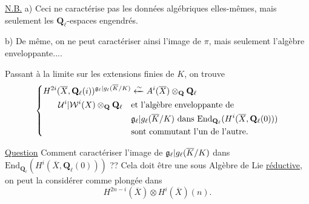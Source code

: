 \uline{N.B.} a) Ceci ne caractérise pas les données algébriques elles-mêmes, mais seulement les $\mathbf{Q}_\ell$-espaces engendrés.

b) De même, on ne peut caractériser ainsi l'image de $\pi$, mais seulement l'algèbre enveloppante....

Passant à la limite sur les extensions finies de $K$, on trouve
\[
\left\{\begin{aligned}
H^{2i}(\overline{X},\mathbf{Q}_\ell(i))^{\mathfrak{g}_\ell|g_\ell(\overline{K}/K)}&\xleftarrow{\sim} A^i(\overline{X})\otimes_{\mathbf{Q}}\mathbf{Q}_\ell\\
\mathcal{U}^i|\mathcal{W}^i(X)\otimes_{\mathbf{Q}}\mathbf{Q}_\ell\quad&\text{et l'algèbre enveloppante de}\\
&\mathfrak{g}_\ell|g_\ell(\overline{K}/K)\text{ dans }\mathrm{End}_{\mathbf{Q}_\ell}(H^i(\overline{X},\mathbf{Q}_\ell(0)))\\
&\text{sont commutant l'un de l'autre.}
\end{aligned}\right.
\]

\uline{Question} Comment caractériser l'image de $\mathfrak{g}_\ell|g_\ell(\overline{K}/K)$ dans $\mathrm{End}_{\mathbf{Q}_\ell}(H^i(\overline{X},\mathbf{Q}_\ell(0)))$ ??
Cela doit être une sous Algèbre de Lie \uline{réductive}, on peut la considérer comme plongée dans
\[
H^{2n-i}(\overline{X})\otimes H^i(\overline{X})(n).
\]
